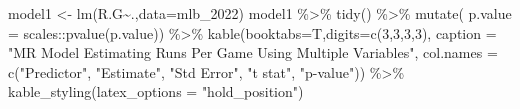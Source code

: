 \documentclass[
  11pt,
]{book}
\newenvironment{Shaded}{\begin{snugshade}}{\end{snugshade}}
\newcommand{\AttributeTok}[1]{\textcolor[rgb]{0.77,0.63,0.00}{#1}}
\newcommand{\DecValTok}[1]{\textcolor[rgb]{0.00,0.00,0.81}{#1}}
\newcommand{\FunctionTok}[1]{\textcolor[rgb]{0.00,0.00,0.00}{#1}}
\newcommand{\NormalTok}[1]{#1}
\newcommand{\OtherTok}[1]{\textcolor[rgb]{0.56,0.35,0.01}{#1}}
\newcommand{\SpecialCharTok}[1]{\textcolor[rgb]{0.00,0.00,0.00}{#1}}
\newcommand{\StringTok}[1]{\textcolor[rgb]{0.31,0.60,0.02}{#1}}
\theoremstyle{definition}
\theoremstyle{definition}
\theoremstyle{definition}
\theoremstyle{definition}
\theoremstyle{remark}
\begin{document}
\newpage

\begin{Shaded}
\begin{Highlighting}[]
\NormalTok{model1 }\OtherTok{\textless{}{-}} \FunctionTok{lm}\NormalTok{(R.G}\SpecialCharTok{\textasciitilde{}}\NormalTok{.,}\AttributeTok{data=}\NormalTok{mlb\_2022)}
\NormalTok{model1 }\SpecialCharTok{\%\textgreater{}\%} \FunctionTok{tidy}\NormalTok{() }\SpecialCharTok{\%\textgreater{}\%}
  \FunctionTok{mutate}\NormalTok{(}
    \AttributeTok{p.value =}\NormalTok{ scales}\SpecialCharTok{::}\FunctionTok{pvalue}\NormalTok{(p.value)) }\SpecialCharTok{\%\textgreater{}\%}
  \FunctionTok{kable}\NormalTok{(}\AttributeTok{booktabs=}\NormalTok{T,}\AttributeTok{digits=}\FunctionTok{c}\NormalTok{(}\DecValTok{3}\NormalTok{,}\DecValTok{3}\NormalTok{,}\DecValTok{3}\NormalTok{,}\DecValTok{3}\NormalTok{), }
        \AttributeTok{caption =} \StringTok{"MR Model Estimating Runs Per Game Using Multiple Variables"}\NormalTok{,}
        \AttributeTok{col.names =} \FunctionTok{c}\NormalTok{(}\StringTok{"Predictor"}\NormalTok{, }\StringTok{"Estimate"}\NormalTok{, }\StringTok{"Std Error"}\NormalTok{, }\StringTok{"t stat"}\NormalTok{, }\StringTok{"p{-}value"}\NormalTok{)) }\SpecialCharTok{\%\textgreater{}\%}
  \FunctionTok{kable\_styling}\NormalTok{(}\AttributeTok{latex\_options =} \StringTok{"hold\_position"}\NormalTok{)}
\end{Highlighting}
\end{Shaded}
\end{document}
